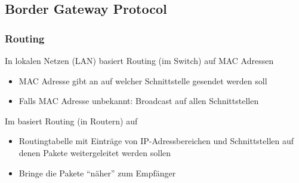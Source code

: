 \subsection{Border Gateway Protocol}
\subsubsection*{Routing}
 In lokalen Netzen (LAN) basiert Routing (im Switch) auf MAC Adressen
\begin{itemize}
    \item MAC Adresse gibt an auf welcher Schnittstelle gesendet werden soll
    \item Falls MAC Adresse unbekannt: Broadcast auf allen Schnittstellen
\end{itemize}
Im  basiert Routing (in Routern) auf 
\begin{itemize}
    \item {} Routingtabelle mit Einträge von IP-Adressbereichen und Schnittstellen auf denen Pakete weitergeleitet werden sollen
    \item {} Bringe die Pakete \enquote{näher} zum Empfänger
\end{itemize}
